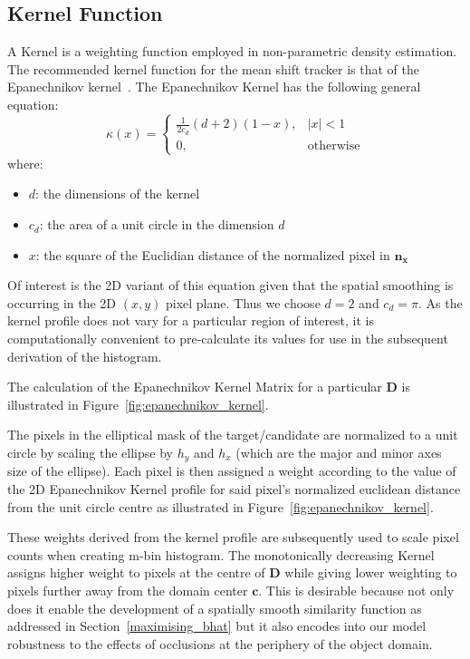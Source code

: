 \subsection{Kernel Function}
A Kernel is a weighting function employed in non-parametric density estimation.
The recommended kernel function for the mean shift tracker is that of the
Epanechnikov kernel~\cite{Comaniciu2002}.
The Epanechnikov Kernel has the following general equation:
\begin{equation}
    \kappa(x)=
    \begin{cases}
        \frac{1}{2c_d}(d+2)(1-x), & |x|<1 \\
        0, & \text{otherwise}
    \end{cases}
\end{equation}
where:
\begin{itemize}
   \item $d$: the dimensions of the kernel
   \item $c_d$: the area of a unit circle in the dimension $d$
   \item $x$: the square of the Euclidian distance of the normalized pixel in
       $\mathbf{n_x}$
\end{itemize}

Of interest is the 2D variant of this equation given that the spatial smoothing
is occurring in the 2D $(x,y)$ pixel plane. Thus we choose $d=2$ and $c_d=\pi$.
As the kernel profile does not vary for a particular region of interest, it is
computationally convenient to pre-calculate its values for use in the subsequent
derivation of the histogram.

The calculation of the Epanechnikov Kernel Matrix for a particular $\mathbf{D}$ is
illustrated in Figure~\ref{fig:epanechnikov_kernel}.


The pixels in the elliptical mask of the target/candidate are normalized to a unit
circle by scaling the ellipse by $h_y$ and $h_x$ (which are the major and minor
axes size of the ellipse). Each pixel is then assigned a weight according to the
value of the 2D Epanechnikov Kernel profile for said pixel's normalized euclidean
distance from the unit circle centre as illustrated in Figure~\ref{fig:epanechnikov_kernel}.

These weights derived from the kernel profile are subsequently used to scale
pixel counts when creating m-bin histogram. The monotonically decreasing Kernel
assigns higher weight to pixels at the centre of $\mathbf{D}$ while giving lower
weighting to pixels further away from the domain center $\mathbf{c}$. 
This is desirable because not only does it enable the development of a spatially
smooth similarity function as addressed in Section~\ref{maximising_bhat} but it
also encodes into our model robustness to the effects of occlusions at the
periphery of the object domain.

